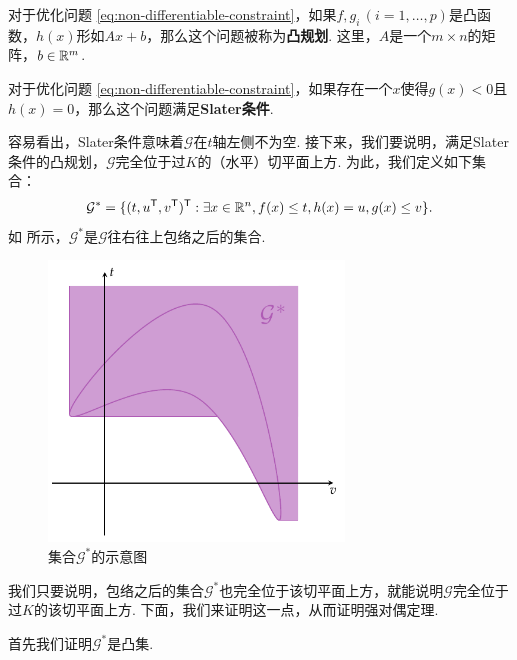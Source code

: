 \begin{definition}[凸规划]
    对于优化问题 \eqref{eq:non-differentiable-constraint}，如果$f,g_i\,(i=1,\dots,p)$是凸函数，$h(x)$形如$Ax+b$，那么这个问题被称为\textbf{凸规划}. 这里，$A$是一个$m\times n$的矩阵，$b\in\mathbb{R}^m$.
\end{definition}

\begin{definition}[Slater条件]
    对于优化问题 \eqref{eq:non-differentiable-constraint}，如果存在一个$x$使得$g(x)<0$且$h(x)=0$，那么这个问题满足\textbf{Slater条件}.
\end{definition}

容易看出，Slater条件意味着$\mathcal G$在$t$轴左侧不为空. 接下来，我们要说明，满足Slater条件的凸规划，$\mathcal G$完全位于过$K$的（水平）切平面上方. 为此，我们定义如下集合：
\[
\mathcal{G}^*=\{(t,u^{\mathsf{T}},v^{\mathsf{T}})^{\mathsf{T}}: \exists x\in\mathbb{R}^n, f(x)\leq t, h(x)=u, g(x)\leq v\}.
\]
如 所示，$\mathcal{G}^*$是$\mathcal G$往右往上包络之后的集合. 

\begin{figure}[ht]
    \centering
    \includegraphics[width=0.7\textwidth]{figures/duality/duality-G-star.pdf}
    \caption{集合$\mathcal{G}^*$的示意图}
    \label{fig:duality-G-star}
\end{figure}

我们只要说明，包络之后的集合$\mathcal G^*$也完全位于该切平面上方，就能说明$\mathcal G$完全位于过$K$的该切平面上方. 下面，我们来证明这一点，从而证明强对偶定理.

首先我们证明$\mathcal G^*$是凸集.

